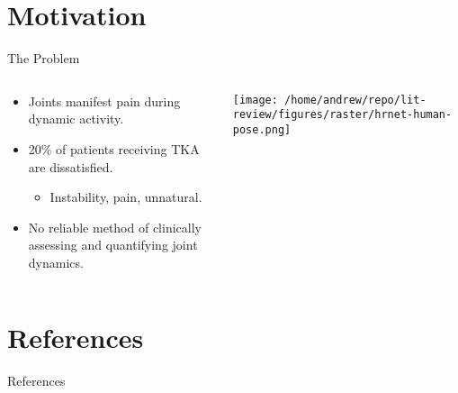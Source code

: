 \documentclass[presentation]{beamer}
\begin{document}
\section{Motivation}
\label{sec:orgca6f5e1}
\begin{frame}[label={sec:org3ac28ad}]{The Problem}
\begin{columns}
\begin{column}{0.5\columnwidth}
\begin{itemize}
\item Joints manifest pain during dynamic activity.
\item 20\% of patients receiving TKA are dissatisfied.
\begin{itemize}
\item Instability, pain, unnatural\autocites{bakerRolePainFunction2007}[][]{bournePatientSatisfactionTotal2010}[][]{scottPredictingDissatisfactionFollowing2010}.
\end{itemize}
\item No reliable method of clinically assessing and quantifying joint dynamics.
\end{itemize}
\end{column}
\begin{column}{0.4\columnwidth}
\begin{center}
\texttt{[image: /home/andrew/repo/lit-review/figures/raster/hrnet-human-pose.png]}
\end{center}
\end{column}
\end{columns}
\end{frame}
\section{References}
\label{sec:orgd33c319}
\begin{frame}[label={sec:orgbf2c20e},fragile, allowframebreaks, label=]{References}
\AtNextBibliography{\tiny}
\printbibliography
\end{frame}
\end{document}
